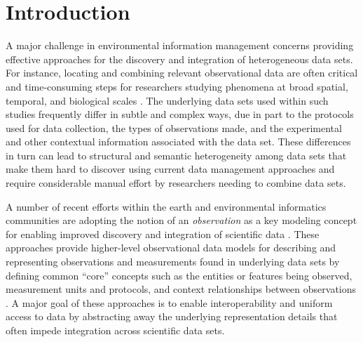 
\section{Introduction}
\label{sec-intro}

A major challenge in environmental information management concerns
providing effective approaches for the discovery and integration of
heterogeneous data sets. For instance, locating and combining relevant
observational data are often critical and time-consuming steps for
researchers studying phenomena at broad spatial, temporal, and
biological scales
\cite{worm06:_impac_of_biodiv_loss_ocean_ecosy_servic,pennings05:_do}. The
underlying data sets used within such studies frequently differ in
subtle and complex ways, due in part to the protocols used for data
collection, the types of observations made, and the experimental and
other contextual information associated with the data set. These
differences in turn can lead to structural and semantic heterogeneity
among data sets that make them hard to discover using current data
management approaches and require considerable manual effort by
researchers needing to combine data sets.

A number of recent efforts within the earth and environmental
informatics communities are adopting the notion of an
\emph{observation} as a key modeling concept for enabling improved
discovery and integration of scientific data
\cite{om,fox09:_ontol,tarboton07:_cuahs_commun_obser_data_model,mungall07:_repres_phenot_in_owl,bowers08}. These
approaches provide higher-level observational data models for
describing and representing observations and measurements found in
underlying data sets by defining common ``core'' concepts such as the
entities or features being observed, measurement units and protocols,
and context relationships between observations \cite{om,bowers08}.  A
major goal of these approaches is to enable interoperability and
uniform access to data by abstracting away the underlying
representation details that often impede integration across scientific
data sets.


